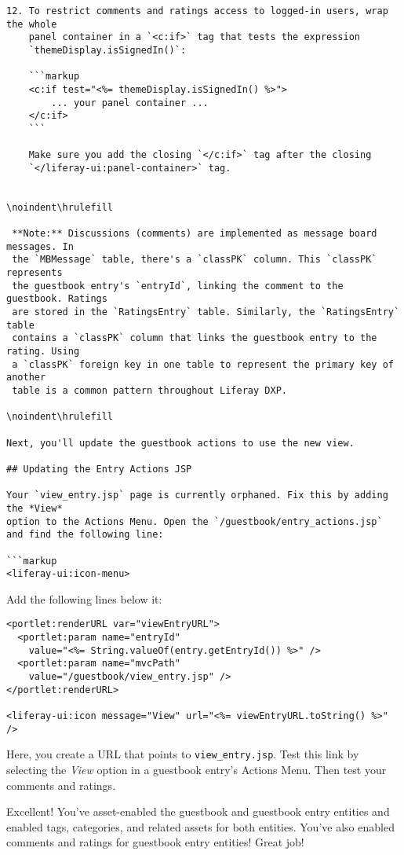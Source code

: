 \begin{verbatim}
12. To restrict comments and ratings access to logged-in users, wrap the whole 
    panel container in a `<c:if>` tag that tests the expression 
    `themeDisplay.isSignedIn()`:

    ```markup
    <c:if test="<%= themeDisplay.isSignedIn() %>">
        ... your panel container ...
    </c:if>
    ```

    Make sure you add the closing `</c:if>` tag after the closing 
    `</liferay-ui:panel-container>` tag.


\noindent\hrulefill

 **Note:** Discussions (comments) are implemented as message board messages. In
 the `MBMessage` table, there's a `classPK` column. This `classPK` represents
 the guestbook entry's `entryId`, linking the comment to the guestbook. Ratings
 are stored in the `RatingsEntry` table. Similarly, the `RatingsEntry` table
 contains a `classPK` column that links the guestbook entry to the rating. Using
 a `classPK` foreign key in one table to represent the primary key of another
 table is a common pattern throughout Liferay DXP.

\noindent\hrulefill

Next, you'll update the guestbook actions to use the new view. 

## Updating the Entry Actions JSP

Your `view_entry.jsp` page is currently orphaned. Fix this by adding the *View*
option to the Actions Menu. Open the `/guestbook/entry_actions.jsp`
and find the following line:

```markup
<liferay-ui:icon-menu>
\end{verbatim}

Add the following lines below it:

\begin{verbatim}
<portlet:renderURL var="viewEntryURL">
  <portlet:param name="entryId"
    value="<%= String.valueOf(entry.getEntryId()) %>" />
  <portlet:param name="mvcPath"
    value="/guestbook/view_entry.jsp" />
</portlet:renderURL>

<liferay-ui:icon message="View" url="<%= viewEntryURL.toString() %>" />
\end{verbatim}

Here, you create a URL that points to \texttt{view\_entry.jsp}. Test
this link by selecting the \emph{View} option in a guestbook entry's
Actions Menu. Then test your comments and ratings.

Excellent! You've asset-enabled the guestbook and guestbook entry
entities and enabled tags, categories, and related assets for both
entities. You've also enabled comments and ratings for guestbook entry
entities! Great job!


